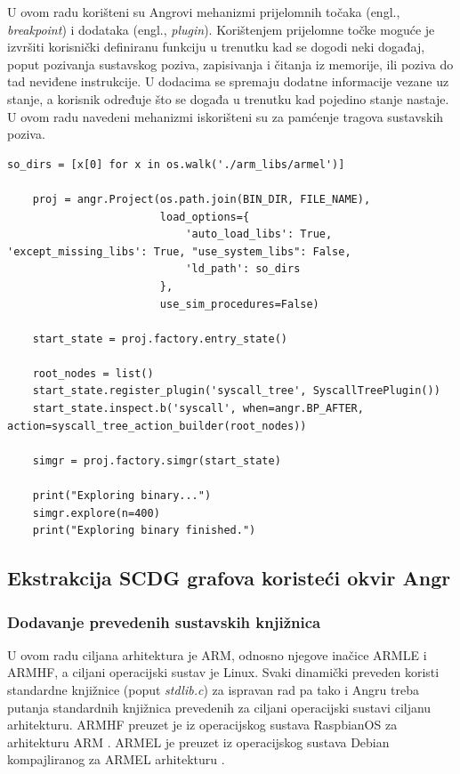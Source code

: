 U ovom radu korišteni su Angrovi mehanizmi prijelomnih točaka (engl.,
\textit{breakpoint}) i dodataka (engl., \textit{plugin}). Korištenjem prijelomne
točke moguće je izvršiti korisnički definiranu funkciju u trenutku kad se dogodi
neki događaj, poput pozivanja sustavskog poziva, zapisivanja i čitanja iz
memorije, ili poziva do tad neviđene instrukcije. U dodacima se spremaju dodatne
informacije vezane uz stanje, a korisnik određuje što se događa u trenutku kad
pojedino stanje nastaje. U ovom radu navedeni mehanizmi iskorišteni su za
pamćenje tragova sustavskih poziva.

\begin{lstlisting}[caption={Dio koda zaslužan za simboličku analizu u angru i učitavanje potrebnih dodataka i vanjskih knjižnica},label={cod:angr_sim}]
    so_dirs = [x[0] for x in os.walk('./arm_libs/armel')]

    proj = angr.Project(os.path.join(BIN_DIR, FILE_NAME),
                        load_options={
                            'auto_load_libs': True, 'except_missing_libs': True, "use_system_libs": False,
                            'ld_path': so_dirs
                        },
                        use_sim_procedures=False)

    start_state = proj.factory.entry_state()

    root_nodes = list()
    start_state.register_plugin('syscall_tree', SyscallTreePlugin())
    start_state.inspect.b('syscall', when=angr.BP_AFTER, action=syscall_tree_action_builder(root_nodes))

    simgr = proj.factory.simgr(start_state)

    print("Exploring binary...")
    simgr.explore(n=400)
    print("Exploring binary finished.")

\end{lstlisting}

\subsection{Ekstrakcija SCDG grafova koristeći okvir Angr}

\subsubsection{Dodavanje prevedenih sustavskih knjižnica}
U ovom radu ciljana arhitektura je ARM, odnosno njegove inačice ARMLE i ARMHF, a
ciljani operacijski sustav je Linux. Svaki dinamički preveden koristi standardne
knjižnice (poput \textit{stdlib.c}) za ispravan rad pa tako i Angru treba
putanja standardnih knjižnica prevedenih za ciljani operacijski sustavi ciljanu
arhitekturu. ARMHF preuzet je iz operacijskog sustava RaspbianOS za arhitekturu
ARM \cite{raspbian_arm}. ARMEL je preuzet iz operacijskog sustava Debian
kompajliranog za ARMEL arhitekturu \cite{armel}. 

